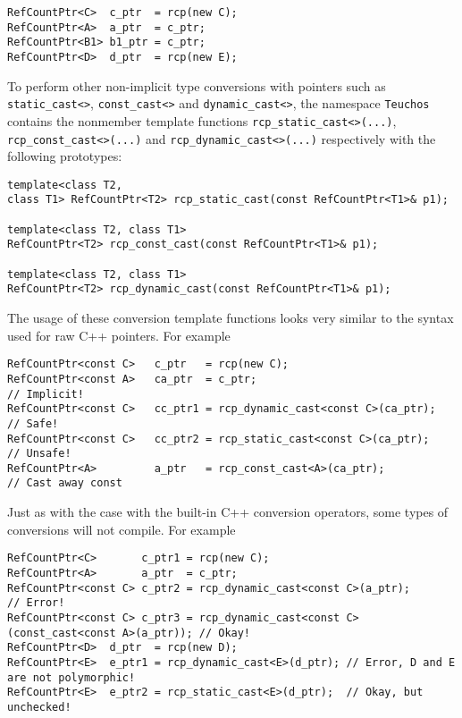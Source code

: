 {\scriptsize\begin{verbatim}
RefCountPtr<C>  c_ptr  = rcp(new C);
RefCountPtr<A>  a_ptr  = c_ptr;
RefCountPtr<B1> b1_ptr = c_ptr;
RefCountPtr<D>  d_ptr  = rcp(new E);
\end{verbatim}}

To perform other non-implicit type conversions with pointers such as
{}\texttt{static\-\_cast<>}, {}\texttt{const\-\_cast<>} and
{}\texttt{dynamic\-\_cast<>}, the namespace {}\texttt{Teuchos}
contains the nonmember template functions
{}\texttt{rcp\-\_static\-\_cast<>(...)},
{}\texttt{rcp\-\_const\-\_cast<>(...)} and
{}\texttt{rcp\-\_dynamic\-\_cast<>(...)} respectively with the
following prototypes:

{\scriptsize\begin{verbatim}
template<class T2,
class T1> RefCountPtr<T2> rcp_static_cast(const RefCountPtr<T1>& p1);

template<class T2, class T1>
RefCountPtr<T2> rcp_const_cast(const RefCountPtr<T1>& p1);

template<class T2, class T1>
RefCountPtr<T2> rcp_dynamic_cast(const RefCountPtr<T1>& p1);
\end{verbatim}}

The usage of these conversion template functions looks very similar to
the syntax used for raw C++ pointers.  For example

{\scriptsize\begin{verbatim}
RefCountPtr<const C>   c_ptr   = rcp(new C);
RefCountPtr<const A>   ca_ptr  = c_ptr;                              // Implicit!
RefCountPtr<const C>   cc_ptr1 = rcp_dynamic_cast<const C>(ca_ptr);  // Safe!
RefCountPtr<const C>   cc_ptr2 = rcp_static_cast<const C>(ca_ptr);   // Unsafe!
RefCountPtr<A>         a_ptr   = rcp_const_cast<A>(ca_ptr);          // Cast away const
\end{verbatim}}

Just as with the case with the built-in C++ conversion operators, some
types of conversions will not compile.  For example

{\scriptsize\begin{verbatim}
RefCountPtr<C>       c_ptr1 = rcp(new C);
RefCountPtr<A>       a_ptr  = c_ptr;
RefCountPtr<const C> c_ptr2 = rcp_dynamic_cast<const C>(a_ptr);                      // Error!
RefCountPtr<const C> c_ptr3 = rcp_dynamic_cast<const C>(const_cast<const A>(a_ptr)); // Okay!
RefCountPtr<D>  d_ptr  = rcp(new D);
RefCountPtr<E>  e_ptr1 = rcp_dynamic_cast<E>(d_ptr); // Error, D and E are not polymorphic!
RefCountPtr<E>  e_ptr2 = rcp_static_cast<E>(d_ptr);  // Okay, but unchecked!
\end{verbatim}}


